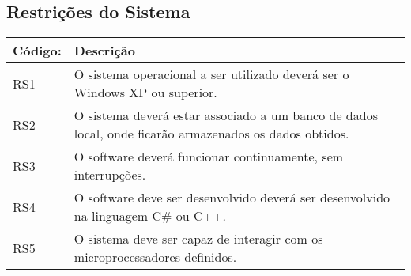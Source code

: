 \documentclass[12pt,openright,oneside,a4paper,brazil]{abntex2}
\begin{document}
\subsection*{Restrições do Sistema}
\begin{table}[!htp]
\centering
\begin{tabular}{|p{4cm}|p{10cm}|}\hline
\textbf{Código:}&\textbf{Descrição}\\ \hline
RS1	&O sistema operacional a ser utilizado deverá ser o Windows XP ou superior.\\ \hline
RS2	&O sistema deverá estar associado a um banco de dados local, onde ficarão armazenados os dados obtidos.\\ \hline
RS3	&O software deverá funcionar continuamente, sem interrupções.\\ \hline
RS4	&O software deve ser desenvolvido deverá ser desenvolvido na linguagem C\# ou C++.\\ \hline
RS5	&O sistema deve ser capaz de interagir com os microprocessadores definidos.\\ \hline

\end{tabular}
\end{table}
\end{document}
